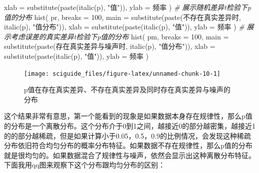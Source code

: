 \documentclass[]{tufte-book}
\newenvironment{Shaded}{}{}
\newcommand{\AttributeTok}[1]{\textcolor[rgb]{0.49,0.56,0.16}{#1}}
\newcommand{\CommentTok}[1]{\textcolor[rgb]{0.38,0.63,0.69}{\textit{#1}}}
\newcommand{\DecValTok}[1]{\textcolor[rgb]{0.25,0.63,0.44}{#1}}
\newcommand{\FunctionTok}[1]{\textcolor[rgb]{0.02,0.16,0.49}{#1}}
\newcommand{\NormalTok}[1]{#1}
\newcommand{\StringTok}[1]{\textcolor[rgb]{0.25,0.44,0.63}{#1}}
\begin{document}
\begin{Shaded}
\begin{Highlighting}[]
        \AttributeTok{xlab =} \FunctionTok{substitute}\NormalTok{(}\FunctionTok{paste}\NormalTok{(}\FunctionTok{italic}\NormalTok{(}\StringTok{\textquotesingle{}p\textquotesingle{}}\NormalTok{), }\StringTok{"值"}\NormalTok{)),}
        \AttributeTok{ylab =} \StringTok{\textquotesingle{}频率\textquotesingle{}}
\NormalTok{)}
\CommentTok{\# 展示随机差异t检验下p值的分布}
\FunctionTok{hist}\NormalTok{(}
\NormalTok{        pr,}
        \AttributeTok{breaks =} \DecValTok{100}\NormalTok{,}
        \AttributeTok{main =} \FunctionTok{substitute}\NormalTok{(}\FunctionTok{paste}\NormalTok{(}\StringTok{\textquotesingle{}不存在真实差异时\textquotesingle{}}\NormalTok{, }\FunctionTok{italic}\NormalTok{(}\StringTok{\textquotesingle{}p\textquotesingle{}}\NormalTok{), }\StringTok{"值分布"}\NormalTok{)),}
        \AttributeTok{xlab =} \FunctionTok{substitute}\NormalTok{(}\FunctionTok{paste}\NormalTok{(}\FunctionTok{italic}\NormalTok{(}\StringTok{\textquotesingle{}p\textquotesingle{}}\NormalTok{), }\StringTok{"值"}\NormalTok{)),}
        \AttributeTok{ylab =} \StringTok{\textquotesingle{}频率\textquotesingle{}}
\NormalTok{)}
\CommentTok{\# 展示考虑误差的真实差异t检验下p值的分布}
\FunctionTok{hist}\NormalTok{(}
\NormalTok{        pm,}
        \AttributeTok{breaks =} \DecValTok{100}\NormalTok{,}
        \AttributeTok{main =} \FunctionTok{substitute}\NormalTok{(}\FunctionTok{paste}\NormalTok{(}\StringTok{\textquotesingle{}存在真实差异与噪声时\textquotesingle{}}\NormalTok{, }\FunctionTok{italic}\NormalTok{(}\StringTok{\textquotesingle{}p\textquotesingle{}}\NormalTok{), }\StringTok{"值分布"}\NormalTok{)),}
        \AttributeTok{xlab =} \FunctionTok{substitute}\NormalTok{(}\FunctionTok{paste}\NormalTok{(}\FunctionTok{italic}\NormalTok{(}\StringTok{\textquotesingle{}p\textquotesingle{}}\NormalTok{), }\StringTok{"值"}\NormalTok{)),}
        \AttributeTok{ylab =} \StringTok{\textquotesingle{}频率\textquotesingle{}}
\NormalTok{)}
\end{Highlighting}
\end{Shaded}

\begin{figure}
\texttt{[image: sciguide\_files/figure-latex/unnamed-chunk-10-1]} \caption[p值在存在真实差异、不存在真实差异及同时存在真实差异与噪声的分布]{p值在存在真实差异、不存在真实差异及同时存在真实差异与噪声的分布}\label{fig:unnamed-chunk-10}
\end{figure}

这个结果非常有意思，第一个能看到的现象是如果数据本身存在规律性，那么p值的分布是一个离散分布。这个分布介于0到1之间，越接近0的部分越密集，越接近1的的部分越稀疏，但是如果计算小于0.05，0.5，0.9的比例情况，会发现这种稀疏分布依旧符合均匀分布的概率分布特征。如果数据不存在规律性，那么p值的分布就是很均匀的。如果数据混合了规律性与噪声，依然会显示出这种离散分布特征。下面我用qq图来观察下这个分布跟均匀分布的区别：
\end{document}
